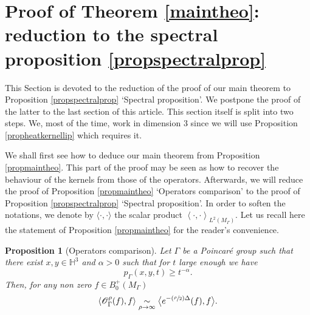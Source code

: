 \documentclass[10pt]{amsart}
\let\mathcal\mathscr
\newcommand{\Psfrac}[2]{(\sfrac{#1}{#2})}
\theoremstyle{plain}
\newtheorem{proposition}[equation]{Proposition}
\theoremstyle{definition}
\newcommand{\equivaut}[1]{\underset{#1}{\sim}}
\begin{document}
\section{Proof of Theorem \ref{maintheo}: reduction to the spectral proposition \ref{propspectralprop}}

\label{secproofmaintheo}

This Section is devoted to the reduction of the proof of our main theorem to Proposition \ref{propspectralprop} `Spectral proposition'. We postpone the proof of the latter to the last section of this article. This section itself is split into two steps. We, most of the time, work in dimension $3$ since we will use Proposition \ref{propheatkernellip} which requires it.

We shall first see how to deduce our main theorem from Proposition \ref{propmaintheo}. This part of the proof may be seen as how to recover the behaviour of the kernels from those of the operators. Afterwards, we will reduce the proof of Proposition \ref{propmaintheo} `Operators comparison' to the proof of Proposition \ref{propspectralprop} `Spectral proposition'. In order to soften the notations, we denote by $\langle \cdot, \cdot \rangle$ the scalar product $\left< \cdot, \cdot \right>_{L^2(M_{\Gamma})}$. Let us recall here the statement of Proposition \ref{propmaintheo} for the reader's convenience.

\begin{proposition}[Operators comparison]\label{prop:operatorscomparison}
Let $\Gamma$ be a Poincaré group such that there exist $x,y \in \mathbb{H}^3$ and $\alpha > 0$ such that for $t$ large enough we have
\[
p_{\Gamma}(x,y,t) \ge t^{-\alpha}.
\]
Then, for any non zero $f \in B^+_0(M_{\Gamma})$
\[
\left< \mathcal{O}_{\Gamma}^{\rho}(f), f \right> \equivaut{\rho \to \infty} \bigl< e^{- \Psfrac{\rho}{2} \Delta}(f), f \bigr>.
\]
\end{proposition}
\end{document}
